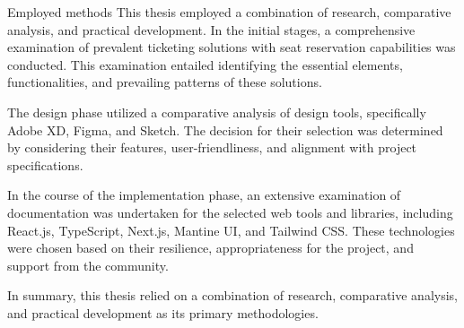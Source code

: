 \begin{section}{Employed methods}
    \label{sec:employed-methods}
    This thesis employed a combination of research, comparative analysis, and practical development.
    In the initial stages, a comprehensive examination of prevalent ticketing solutions with seat reservation capabilities was conducted.
    This examination entailed identifying the essential elements, functionalities, and prevailing patterns of these solutions.

    The design phase utilized a comparative analysis of design tools, specifically Adobe XD, Figma, and Sketch.
    The decision for their selection was determined by considering their features, user-friendliness, and alignment with project specifications.

    In the course of the implementation phase, an extensive examination of documentation was undertaken for the selected web tools and libraries, including React.js, TypeScript, Next.js, Mantine UI, and Tailwind CSS.
    These technologies were chosen based on their resilience, appropriateness for the project, and support from the community.

    In summary, this thesis relied on a combination of research, comparative analysis, and practical development as its primary methodologies.
\end{section}

